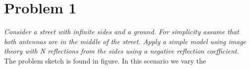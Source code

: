 \section{Problem 1}
\textit{Consider a street with infinite sides and a ground. For simplicity assume that both antennas are in the middle of the street. Apply a simple model using image theory with N reflections from the sides using a negative reflection coefficient.}\\

The problem sketch is found in figure. In this scenario we vary the 
